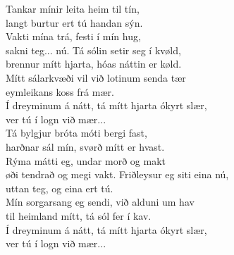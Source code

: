 \begin{flushleft}
Tankar mínir leita heim til tín, \\
langt burtur ert tú handan sýn.\\
Vakti mína trá, festi í mín hug,\tab{}\\
sakni teg... nú.\tab{}\tab{}
\hops
Tá sólin setir seg í kvøld,\tab{}\\
brennur mítt hjarta, hóas náttin er køld.\\
Mítt sálarkvæði vil við lotinum senda tær \\
eymleikans koss frá mær. \tab{}
\hops
\hspace{0.9cm}\\
\hspace{0.9cm}Í dreyminum á nátt, tá mítt hjarta ókyrt slær, \\
\hspace{0.9cm}ver tú í logn við mær...\tab{}\tab{}\\
\hops
Tá bylgjur bróta móti bergi fast,\\
harðnar sál mín, svørð mítt er hvast.\\
Rýma mátti eg, undar morð og makt\\
øði tendrað og megi vakt.
\hops
Friðleysur eg siti eina nú,\\
uttan teg, og eina ert tú.\\
Mín sorgarsang eg sendi, við alduni um hav\\
til heimland mítt, tá sól fer í kav.
\hops
\hspace{0.9cm}\\
\hspace{0.9cm}Í dreyminum á nátt, tá mítt hjarta ókyrt slær,\\
\hspace{0.9cm}ver tú í logn við mær...\\
\end{flushleft}


\newpage

